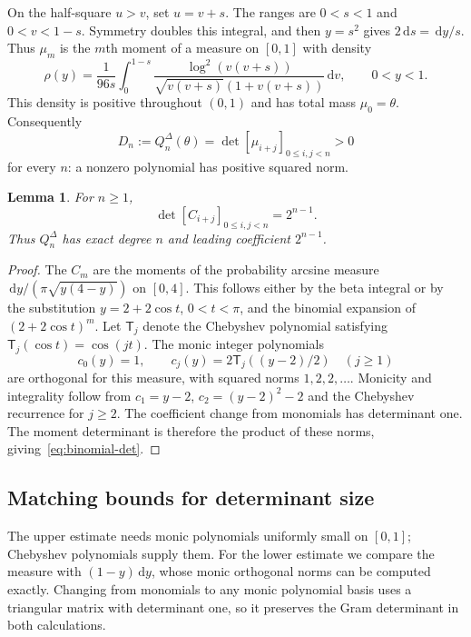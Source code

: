 \documentclass[11pt]{article}
\newtheorem{lemma}[theorem]{Lemma}
\theoremstyle{definition}
\theoremstyle{remark}
\numberwithin{equation}{section}
\newcommand{\dd}{\,\mathrm d}
\begin{document}
On the half-square $u>v$, set $u=v+s$. The ranges are
$0<s<1$ and $0<v<1-s$. Symmetry doubles this integral, and then
$y=s^2$ gives $2\dd s=\dd y/s$. Thus $\mu_m$ is the $m$th
moment of a measure on $[0,1]$ with density
\begin{equation}\label{eq:rho}
 \rho(y)=\frac1{96s}\int_0^{1-s}
 \frac{\log^2(v(v+s))}{\sqrt{v(v+s)}(1+v(v+s))}\dd v,
 \qquad 0<y<1.
\end{equation}
This density is positive throughout $(0,1)$ and has total mass
$\mu_0=\theta$. Consequently
\begin{equation}\label{eq:Dpositive}
 D_n:=Q_n^{\Delta}(\theta)=\det[\mu_{i+j}]_{0\leq i,j<n}>0
\end{equation}
for every $n$: a nonzero polynomial has positive squared norm.

\begin{lemma}\label{lem:binomial-det}
For $n\geq1$,
\begin{equation}\label{eq:binomial-det}
 \det[C_{i+j}]_{0\leq i,j<n}=2^{n-1}.
\end{equation}
Thus $Q_n^{\Delta}$ has exact degree $n$ and leading coefficient $2^{n-1}$.
\end{lemma}

\begin{proof}
The $C_m$ are the moments of the probability arcsine measure
$\dd y/(\pi\sqrt{y(4-y)})$ on $[0,4]$. This follows either by the beta
integral or by the substitution $y=2+2\cos t$, $0<t<\pi$, and the
binomial expansion of $(2+2\cos t)^m$.
Let $\mathsf T_j$ denote the Chebyshev polynomial satisfying
$\mathsf T_j(\cos t)=\cos(jt)$. The monic integer polynomials
\[
 c_0(y)=1,\qquad c_j(y)=2\mathsf T_j((y-2)/2)\quad(j\geq1)
\]
are orthogonal for this measure, with squared norms $1,2,2,\ldots$.
Monicity and integrality follow from $c_1=y-2$, $c_2=(y-2)^2-2$ and
the Chebyshev recurrence for $j\geq2$. The coefficient change from
monomials has determinant one. The moment determinant is therefore the
product of these norms, giving~\eqref{eq:binomial-det}.
\end{proof}

\subsection{Matching bounds for determinant size}

The upper estimate needs monic polynomials uniformly small on $[0,1]$;
Chebyshev polynomials supply them. For the lower estimate we compare
the measure with $(1-y)\dd y$, whose monic orthogonal norms can be
computed exactly. Changing from monomials to any monic polynomial
basis uses a triangular matrix with determinant one, so it preserves
the Gram determinant in both calculations.
\end{document}
